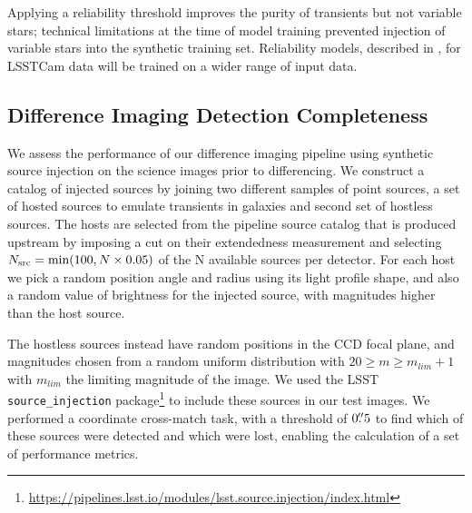Applying a reliability threshold improves the purity of transients but not variable stars; technical limitations at the time of model training prevented injection of variable stars into the synthetic training set.
Reliability models, described in ,  for \gls{LSSTCam} data will be trained on a wider range of input data.

\subsection{Difference Imaging Detection Completeness} \label{sec:perf:dia_completeness}

We assess the performance of our difference imaging \gls{pipeline} using synthetic source injection on the science images prior to differencing.
We construct a catalog of injected sources by joining two different samples of point sources, a set of hosted sources to emulate transients in galaxies and second set of hostless sources.
The hosts are selected from the pipeline source catalog that is produced upstream by imposing a cut on their extendedness measurement and selecting $N_{\rm src}={\rm min}(100, N\times0.05)$ of the N available sources per detector.
For each host we pick a random position angle and radius using its light profile \gls{shape}, and also a random value of brightness for the injected source, with magnitudes higher than the host source.

The hostless sources instead have random positions in the \gls{CCD} focal plane, and magnitudes chosen from a random uniform distribution with $20 \geq m \geq m_{lim} + 1$  with $m_{lim}$ the limiting magnitude of the image.
We used the \gls{LSST}  \texttt{source\_injection} package\footnote{\url{https://pipelines.lsst.io/modules/lsst.source.injection/index.html}} to include these sources in our test images.
We performed a coordinate cross-match task, with a threshold of $0\mbox{$.\!\!^{\prime\prime}$}5$ to find which of these sources were detected and which were lost, enabling the calculation of a set of performance metrics.

